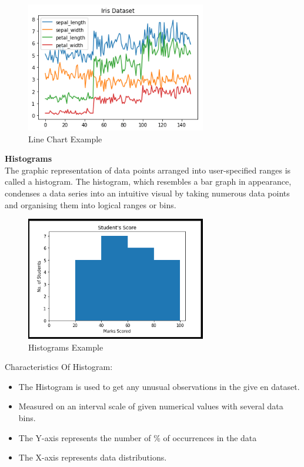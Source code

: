 \begin{figure}[H]
    \centering
    \includegraphics[width=0.7\textwidth]{Images/matplotlib_line_chart-min.png}
    \caption{Line Chart Example}
    \label{fig1}
\end{figure}

\textbf{Histograms} \\
The graphic representation of data points arranged into user-specified ranges is called a histogram. The histogram, which resembles a bar graph in appearance, condenses a data series into an intuitive visual by taking numerous data points and organising them into logical ranges or bins.

\begin{figure}[H]
    \centering
    \includegraphics[width=0.7\textwidth]{Images/45209histo.png}
    \caption{Histograms Example}
    \label{fig1}
\end{figure}


Characteristics Of Histogram:
\begin{itemize}
    \item The Histogram is used to get any unusual observations in the give en dataset.
\item Measured on an interval scale of given numerical values with several data bins.
\item The Y-axis represents the number of \% of occurrences in the data
\item The X-axis represents data distributions.
\end{itemize}

